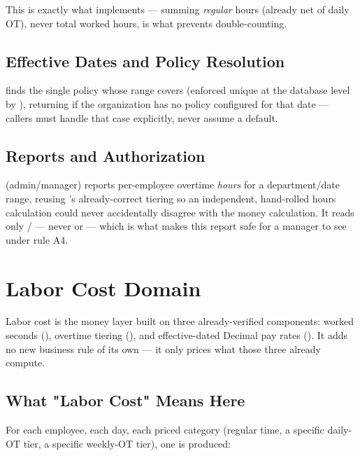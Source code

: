 This is exactly what  implements ---
summing \emph{regular} hours (already net of daily OT), never total
worked hours, is what prevents double-counting.

\subsection*{Effective Dates and Policy Resolution}

 finds the
single policy whose  range
covers  (enforced unique at the database level by
), returning
 if the organization has no policy configured for that date
--- callers must handle that case explicitly, never assume a default.

\subsection*{Reports and Authorization}

 (admin/manager) reports per-employee
overtime \emph{hours} for a department/date range, reusing
's already-correct tiering
so an independent, hand-rolled hours calculation could never
accidentally disagree with the money calculation. It reads only
/ --- never  or
 --- which is what makes this report safe for a manager to
see under rule A4.

\section{Labor Cost Domain}

Labor cost is the money layer built on three already-verified
components: worked seconds (), overtime tiering
(), and effective-dated Decimal pay rates
(). It adds no new business rule of its own --- it
only prices what those three already compute.

\subsection*{What "Labor Cost" Means Here}

For each employee, each day, each priced category (regular time, a
specific daily-OT tier, a specific weekly-OT tier), one 
is produced:


